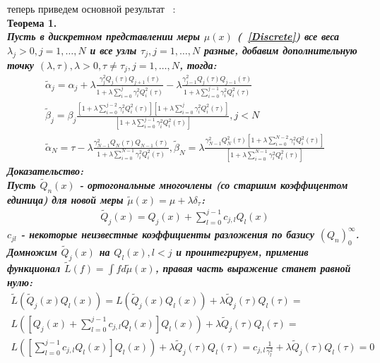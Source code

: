 теперь приведем основной результат ~\cite{Fischer2}: \\
\bf Теорема 1. \rm \\
\it Пусть в дискретном представлении меры $\mu(x)$ (~\ref{Discrete})
все веса $\lambda_j>0,j=1,\ldots,N$ и все узлы $\tau_j,j=1,\ldots,N$ разные,
добавим дополнительную точку $(\lambda,\tau),\lambda>0,\tau \not = \tau_j,j=1,\ldots,N$,
тогда:
\begin{eqnarray}
\label{FischerMass}
\tilde{\alpha}_j=\alpha_j+\lambda
\frac {\gamma_j^2 Q_j(\tau) Q_{j+1}(\tau)}
{1+\lambda\sum\limits_{i=0}^{j}{\gamma_i^2 Q_i^2(\tau)}}-
\lambda\frac {\gamma_{j-1}^2 Q_j(\tau) Q_{j-1}(\tau)}
{1+\lambda\sum\limits_{i=0}^{j-1}{\gamma_i^2 Q_i^2(\tau)}} \nonumber \\
\tilde{\beta}_j=\beta_j
\frac {
\left[
1+ \lambda\sum\limits_{i=0}^{j-2}{\gamma_i^2 Q_i^2(\tau)}
\right]
\left[
1+ \lambda\sum\limits_{i=0}^{j}{\gamma_i^2 Q_i^2(\tau)}
\right]
}
{
\left[
1+ \lambda\sum\limits_{i=0}^{j-1}{\gamma_i^2 Q_i^2(\tau)}
\right]
}, j<N \\
\tilde{\alpha}_N=\tau-\lambda
\frac {\gamma_{N-1}^2 Q_N(\tau) Q_{N-1}(\tau)}
{1+\lambda\sum\limits_{i=0}^{N-1}{\gamma_i^2 Q_i^2(\tau)}},
\tilde{\beta}_N=\lambda
\frac {
\gamma_{N-1}^2Q_N^2(\tau)
\left[
1+ \lambda\sum\limits_{i=0}^{N-2}{\gamma_i^2 Q_i^2(\tau)}
\right]
}
{
\left[
1+ \lambda\sum\limits_{i=0}^{N-1}{\gamma_i^2 Q_i^2(\tau)}
\right]
} \nonumber
\end{eqnarray}
\bf Доказательство: \rm  \\
Пусть $\tilde{Q}_n(x)$ - ортогональные многочлены (со старшим коэффицентом единица)
для новой меры $\tilde{\mu}(x)=\mu+\lambda\delta_{\tau}$:
\begin{eqnarray}
\label{QMass}
\tilde{Q}_j(x)=Q_j(x)+\sum\limits_{l=0}^{j-1}{c_{j,l}Q_l(x)} \nonumber
\end{eqnarray}
$c_{jl}$ - некоторые неизвестные коэффициенты
разложения по базису $(Q_n)_0^{\infty}$.\\
Домножим $\tilde{Q}_j(x)$ на $Q_l(x),l<j$ и проинтегрируем,
применив функционал $\tilde{L}(f)=\int f d\tilde{\mu}(x)$,
правая часть выражение станет равной нулю:
\begin{eqnarray}
\tilde{L}(\tilde{Q}_j(x)Q_l(x))=L(\tilde{Q}_j(x)Q_l(x))+\lambda\tilde{Q}_j(\tau)Q_l(\tau)= \nonumber \\
L(\left[Q_j(x)+\sum\limits_{l=0}^{j-1}{c_{j,l}Q_l(x)}\right]Q_l(x))+\lambda\tilde{Q}_j(\tau)Q_l(\tau)= \nonumber \\
L(\left[\sum\limits_{l=0}^{j-1}{c_{j,l}Q_l(x)}\right]Q_l(x))+\lambda\tilde{Q}_j(\tau)Q_l(\tau)=
c_{j,l}\frac{1}{\gamma_l^2}+\lambda\tilde{Q}_j(\tau)Q_l(\tau)=0 \nonumber
\end{eqnarray}
